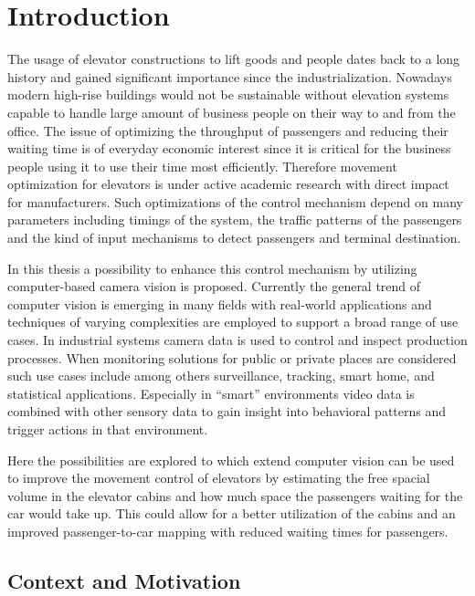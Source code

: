 \chapter{Introduction}
\label{chap:intro}

The usage of elevator constructions to lift goods and people dates back to a long history and gained significant importance since the industrialization.
Nowadays modern high-rise buildings would not be sustainable without elevation systems capable to handle large amount of business people on their way to and from the office. 
The issue of optimizing the throughput of passengers and reducing their waiting time is of everyday economic interest since it is critical for the business people using it to use their time most efficiently. 
Therefore movement optimization for elevators is under active academic research with direct impact for manufacturers.
Such optimizations of the control mechanism depend on many parameters including timings of the system, the traffic patterns of the passengers and the kind of input mechanisms to detect passengers and terminal destination.

In this thesis a possibility to enhance this control mechanism by utilizing computer-based camera vision is proposed.
Currently the general trend of computer vision is emerging in many fields with real-world applications
and techniques of varying complexities are employed to support a broad range of use cases. 
In industrial systems camera data is used to control and inspect production processes. 
When monitoring solutions for public or private places are considered such use cases include among others surveillance, tracking,
smart home, and statistical applications.
Especially in \enquote{smart} environments video data is combined with other sensory data to gain insight into behavioral patterns and trigger actions in that environment.

Here the possibilities are explored to which extend
computer vision can be used to improve the movement control of elevators by estimating the free spacial volume in the elevator cabins and how much space the passengers waiting for the car would take up.
This could allow for a better utilization of the cabins and an improved passenger-to-car mapping with reduced waiting times for passengers.

\section{Context and Motivation}
\label{sec:into:context}

